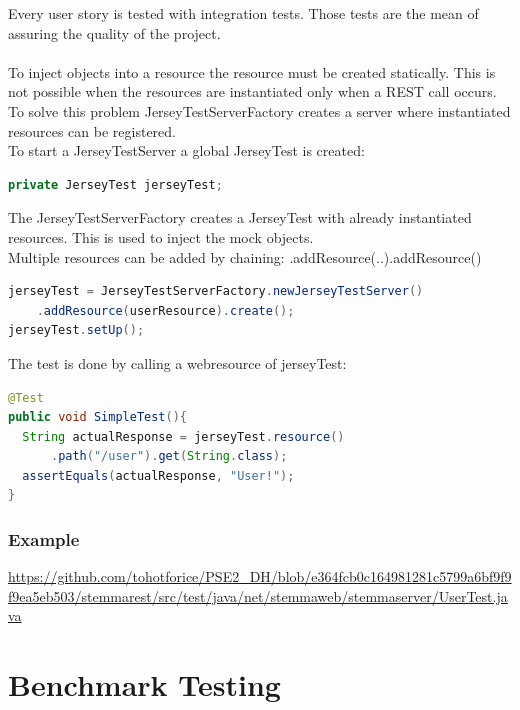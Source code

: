 \documentclass[11pt,fleqn,openany]{book} %
\begin{document}
Every user story is tested with integration tests. Those tests are the mean of assuring the quality of the project. \\ \quad \\ To inject objects into a resource the resource must be created statically. This is not possible when the resources are instantiated only when a REST call occurs. To solve this problem JerseyTestServerFactory creates a server where instantiated resources can be registered.\\
To start a JerseyTestServer a global JerseyTest is created:
\begin{lstlisting}[language=java]
private JerseyTest jerseyTest;
\end{lstlisting}
The JerseyTestServerFactory creates a JerseyTest with already instantiated resources. This is used to inject the mock objects.\\
 Multiple resources can be added by chaining: .addResource(..).addResource()
\begin{lstlisting}[language=java]
jerseyTest = JerseyTestServerFactory.newJerseyTestServer()
	.addResource(userResource).create();
jerseyTest.setUp();
\end{lstlisting}

The test is done by calling a webresource of jerseyTest:
\begin{lstlisting}[language=java]
@Test
public void SimpleTest(){
  String actualResponse = jerseyTest.resource()
      .path("/user").get(String.class);
  assertEquals(actualResponse, "User!");
}
\end{lstlisting}

\subsection*{Example}
\url{https://github.com/tohotforice/PSE2_DH/blob/e364fcb0c164981281c5799a6bf9f9f9ea5eb503/stemmarest/src/test/java/net/stemmaweb/stemmaserver/UserTest.java}



\chapter{Benchmark Testing}
\end{document}

